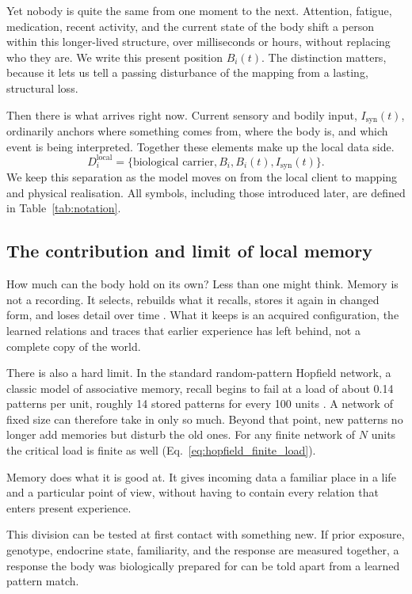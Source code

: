 Yet nobody is quite the same from one moment to the next. Attention, fatigue,
medication, recent activity, and the current state of the body shift a person within
this longer-lived structure, over milliseconds or hours, without replacing who they
are. We write this present position $B_i(t)$. The distinction matters, because it lets
us tell a passing disturbance of the mapping from a lasting, structural loss.

Then there is what arrives right now. Current sensory and bodily input,
$I_{\mathrm{syn}}(t)$, ordinarily anchors where something comes from, where the body
is, and which event is being interpreted. Together these elements make up the local
data side.
\[
  D_i^{\mathrm{local}}
  =\{\text{biological carrier},B_i,B_i(t),I_{\mathrm{syn}}(t)\}.
\]
We keep this separation as the model moves on from the local client to mapping and
physical realisation. All symbols, including those introduced later, are defined in
Table~\ref{tab:notation}.

\subsection{The contribution and limit of local memory}

How much can the body hold on its own? Less than one might think. Memory is not a
recording. It selects, rebuilds what it recalls, stores it again in changed form, and
loses detail over time \citep{schacter2007}. What it keeps is an acquired
configuration, the learned relations and traces that earlier experience has left
behind, not a complete copy of the world.

There is also a hard limit. In the standard random-pattern Hopfield network, a
classic model of associative memory, recall begins to fail at a load of about 0.14
patterns per unit, roughly 14 stored patterns for every 100 units \citep{amit1985}.
A network of fixed size can therefore take in only so much. Beyond that point, new
patterns no longer add memories but disturb the old ones. For any finite network of
$N$ units the critical load is finite as well (Eq.~\eqref{eq:hopfield_finite_load}).

Memory does what it is good at. It gives incoming data a familiar place in a life and
a particular point of view, without having to contain every relation that enters
present experience.

This division can be tested at first contact with something new. If prior exposure,
genotype, endocrine state, familiarity, and the response are measured together, a
response the body was biologically prepared for can be told apart from a learned
pattern match.

